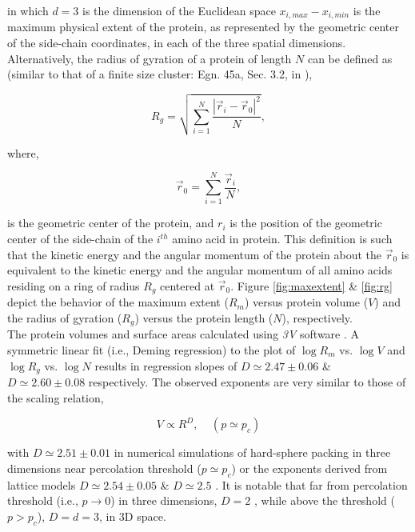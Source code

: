 \documentclass[11pt]{article}
\begin{document}
    \noindent in which $d=3$ is the dimension of the Euclidean space $x_{i,max} - x_{i,min}$ is the maximum physical extent of the protein, as represented by the geometric center of the side-chain coordinates, in each of the three spatial dimensions. Alternatively, the radius of gyration of a protein of length $N$ can be defined as (similar to that of a finite size cluster: Egn. 45a, Sec. 3.2, in \cite{stauffer_introduction_1994}),

    \begin{equation}
        \label{eqn:rg}
        R_g = \sqrt{\sum_{i=1}^N \frac{|\vec r_i-\vec r_0|^2}{N}},
    \end{equation}

    \noindent where,

    \begin{equation}
        \label{eqn:com}
        \vec r_0 = \sum_{i=1}^N \frac{\vec r_i}{N},
    \end{equation}

    \noindent is the geometric center of the protein, and $r_i$ is the position of the geometric center of the side-chain of the $i^{th}$ amino acid in protein. This definition is such that the kinetic energy and the angular momentum of the protein about the $\vec r_0$ is equivalent to the kinetic energy and the angular momentum of all amino acids residing on a ring of radius $R_g$ centered at $\vec r_0$. Figure \ref{fig:maxextent} \& \ref{fig:rg} depict the behavior of the maximum extent ($R_m$) versus protein volume ($V$) and the radius of gyration ($R_g$) versus the protein length ($N$), respectively. \\



    The protein volumes and surface areas calculated using {\it 3V} software \cite{voss_3v:_2010}. A symmetric linear fit (i.e., Deming regression) to the plot of $\log R_m$ vs. $\log V$ and $\log R_g$ vs. $\log N$ results in regression slopes of $D\simeq2.47\pm0.06$ \& $D\simeq2.60\pm0.08$ respectively. The observed exponents are very similar to those of the scaling relation,

    \begin{equation}
        V \propto R^{D}, ~~~~~ (p\simeq p_c)
    \end {equation}

    \noindent with $D\simeq2.51\pm0.01$ in numerical simulations of hard-sphere packing \cite{lorenz_universality_1993} in three dimensions near percolation threshold ($p\simeq p_c$) or the exponents derived from lattice models $D\simeq2.54\pm0.05$ \cite{adler_series_1990} \& $D\simeq2.5$ \cite{stauffer_introduction_1994}. It is notable that far from percolation threshold (i.e., $p\rightarrow 0$) in three dimensions, $D=2$ \cite{parisi_critical_1981}, while above the threshold ($p>p_c$), $D=d=3$, in 3D space.
\end{document}

